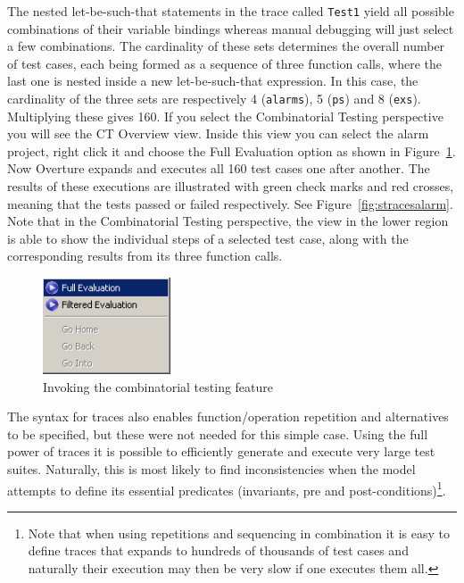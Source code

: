 {\noindent The nested let-be-such-that statements in the trace
called \texttt{Test1} yield all possible combinations of
their variable bindings whereas manual debugging will just select a
few combinations.  The cardinality of these sets determines the
overall number of test cases, each being formed as a sequence of three
function calls, where the last one is nested inside a new
let-be-such-that expression. In this case, the cardinality of the three
sets are respectively 4 (\texttt{alarms}), 5 (\texttt{ps}) and 8 (\texttt{exs}). Multiplying these gives 160. If you
select the Combinatorial Testing perspective you will see the
\textsf{CT Overview} view. Inside this view you can select the alarm
project, right click it and choose the \textsf{Full Evaluation}
option as shown in Figure~\ref{fig:CToptions}. 
Now Overture expands and executes all 160 test cases one after
another. The results of these executions are illustrated with green
check marks and red crosses, meaning that the tests passed or failed
respectively. See Figure~\ref{fig:stracesalarm}. Note that in the
Combinatorial Testing perspective, the view in the lower region is
able to show the individual steps of a selected test case, along with
the corresponding results from its three function calls.

\begin{figure}[htbp]
\begin{center}
\includegraphics[width=1.5in]{figures/CToptions}
\caption{Invoking the combinatorial testing feature\label{fig:CToptions}}
\end{center}
\end{figure}

The syntax for traces also enables function/operation repetition and alternatives to be
specified, but these were not needed for this simple case. Using the full power
of traces it is possible to efficiently generate and execute very large test
suites. Naturally, this is most likely to find inconsistencies when the model
attempts to define its essential predicates (invariants, pre and
post-conditions)\footnote{Note that when using repetitions and
  sequencing in combination it is easy to define traces that expands
  to hundreds of thousands of test cases and naturally their execution
  may then be very slow if one executes them all.}.

}
